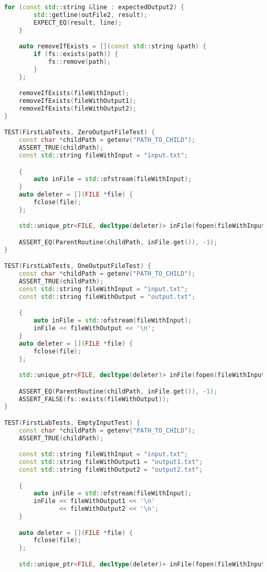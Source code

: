 \documentclass[a4paper, 12pt]{article}
\begin{document}
\begin{lstlisting}[language=C++]
    for (const std::string &line : expectedOutput2) {
        std::getline(outFile2, result);
        EXPECT_EQ(result, line);
    }

    auto removeIfExists = [](const std::string &path) {
        if (fs::exists(path)) {
            fs::remove(path);
        }
    };

    removeIfExists(fileWithInput);
    removeIfExists(fileWithOutput1);
    removeIfExists(fileWithOutput2);
}

TEST(FirstLabTests, ZeroOutputFileTest) {
    const char *childPath = getenv("PATH_TO_CHILD");
    ASSERT_TRUE(childPath);
    const std::string fileWithInput = "input.txt";

    {
        auto inFile = std::ofstream(fileWithInput);
    }
    auto deleter = [](FILE *file) {
        fclose(file);
    };

    std::unique_ptr<FILE, decltype(deleter)> inFile(fopen(fileWithInput.c_str(), "r"), deleter);

    ASSERT_EQ(ParentRoutine(childPath, inFile.get()), -1);
}

TEST(FirstLabTests, OneOutputFileTest) {
    const char *childPath = getenv("PATH_TO_CHILD");
    ASSERT_TRUE(childPath);
    const std::string fileWithInput = "input.txt";
    const std::string fileWithOutput = "output.txt";

    {
        auto inFile = std::ofstream(fileWithInput);
        inFile << fileWithOutput << '\n';
    }
    auto deleter = [](FILE *file) {
        fclose(file);
    };

    std::unique_ptr<FILE, decltype(deleter)> inFile(fopen(fileWithInput.c_str(), "r"), deleter);

    ASSERT_EQ(ParentRoutine(childPath, inFile.get()), -1);
    ASSERT_FALSE(fs::exists(fileWithOutput));
}

TEST(FirstLabTests, EmptyInputTest) {
    const char *childPath = getenv("PATH_TO_CHILD");
    ASSERT_TRUE(childPath);

    const std::string fileWithInput = "input.txt";
    const std::string fileWithOutput1 = "output1.txt";
    const std::string fileWithOutput2 = "output2.txt";

    {
        auto inFile = std::ofstream(fileWithInput);
        inFile << fileWithOutput1 << '\n'
               << fileWithOutput2 << '\n';
    }

    auto deleter = [](FILE *file) {
        fclose(file);
    };

    std::unique_ptr<FILE, decltype(deleter)> inFile(fopen(fileWithInput.c_str(), "r"), deleter);


\end{lstlisting}
\end{document}
